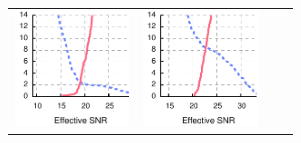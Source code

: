 \begin{figure}[p]
\begin{xtrafullpage}
\begin{tabular}{cccc}
	\includegraphics[height=1.2in]{figures/delivery/goodbad/esnr_goodbad_6.pdf} &
	\includegraphics[height=1.2in]{figures/delivery/goodbad/esnr_goodbad_7.pdf} \\


\end{tabular}
\end{xtrafullpage}
\end{figure}
